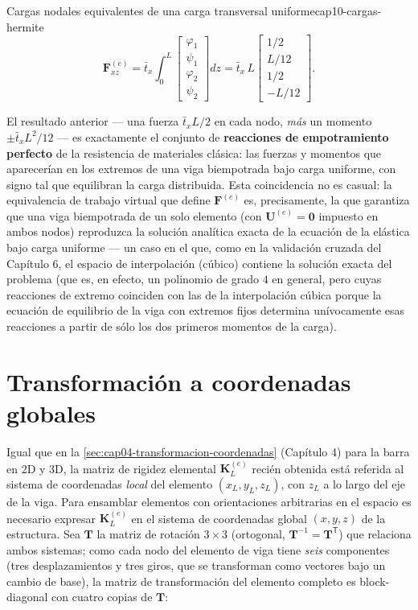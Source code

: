 \begin{ecnimportante}{Cargas nodales equivalentes de una carga transversal uniforme}{cap10-cargas-hermite}
\[
\bm F^{(e)}_{xz} = \bar t_x\int_0^{L}\begin{bmatrix}\varphi_1\\\psi_1\\\varphi_2\\\psi_2\end{bmatrix}dz
= \bar t_x\,L\begin{bmatrix} 1/2 \\ L/12 \\ 1/2 \\ -L/12 \end{bmatrix} .
\]
\end{ecnimportante}

\begin{observacion}
El resultado anterior --- una fuerza $\bar t_x L/2$ en cada nodo, \emph{más} un momento $\pm\bar t_xL^2/12$ --- es exactamente el conjunto de \textbf{reacciones de empotramiento perfecto} de la resistencia de materiales clásica: las fuerzas y momentos que aparecerían en los extremos de una viga biempotrada bajo carga uniforme, con signo tal que equilibran la carga distribuida. Esta coincidencia no es casual: la equivalencia de trabajo virtual que define $\bm F^{(e)}$ es, precisamente, la que garantiza que una viga biempotrada de un solo elemento (con $\bm U^{(e)}=\bm 0$ impuesto en ambos nodos) reproduzca la solución analítica exacta de la ecuación de la elástica bajo carga uniforme --- un caso en el que, como en la validación cruzada del Capítulo 6, el espacio de interpolación (cúbico) contiene la solución exacta del problema (que es, en efecto, un polinomio de grado $4$ en general, pero cuyas reacciones de extremo coinciden con las de la interpolación cúbica porque la ecuación de equilibrio de la viga con extremos fijos determina unívocamente esas reacciones a partir de sólo los dos primeros momentos de la carga).
\end{observacion}

\section{Transformación a coordenadas globales}
\label{sec:cap10-transformacion}

Igual que en la \cref{sec:cap04-transformacion-coordenadas} (Capítulo 4) para la barra en 2D y 3D, la matriz de rigidez elemental $\bm K^{(e)}_L$ recién obtenida está referida al sistema de coordenadas \emph{local} del elemento $(x_L,y_L,z_L)$, con $z_L$ a lo largo del eje de la viga. Para ensamblar elementos con orientaciones arbitrarias en el espacio es necesario expresar $\bm K^{(e)}_L$ en el sistema de coordenadas global $(x,y,z)$ de la estructura. Sea $\bm T$ la matriz de rotación $3\times3$ (ortogonal, $\bm T^{-1}=\bm T^{\mathsf T}$) que relaciona ambos sistemas; como cada nodo del elemento de viga tiene \emph{seis} componentes (tres desplazamientos y tres giros, que se transforman como vectores bajo un cambio de base), la matriz de transformación del elemento completo es block-diagonal con cuatro copias de $\bm T$:


